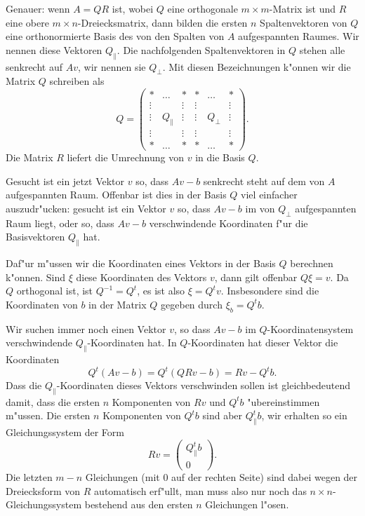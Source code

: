 Genauer: wenn $A=QR$ ist, wobei $Q$ eine orthogonale $m\times m$-Matrix
ist und $R$ eine obere $m\times n$-Dreiecksmatrix, dann bilden die
ersten $n$ Spaltenvektoren von $Q$ eine orthonormierte Basis des
von den Spalten von $A$ aufgespannten Raumes.
Wir nennen diese Vektoren
$Q_{\|}$.
Die nachfolgenden Spaltenvektoren
in $Q$ stehen alle senkrecht auf $Av$, wir nennen sie $Q_{\perp}$.
Mit diesen Bezeichnungen k"onnen wir die Matrix $Q$ schreiben als
\[
Q=\begin{pmatrix}
*     &\dots &     *&      *&\dots   &*     \\
\vdots&      &\vdots&\vdots &        &\vdots\\
\vdots&Q_{\|}&\vdots&\vdots&Q_{\perp}&\vdots\\
\vdots&      &\vdots&\vdots &        &\vdots\\
*     &\dots &     *&      *&\dots   &*     
\end{pmatrix}.
\]
Die Matrix $R$ liefert die Umrechnung von $v$ in die Basis $Q$.

Gesucht ist ein jetzt Vektor $v$ so, dass
$Av-b$ senkrecht steht auf dem von $A$ aufgespannten Raum.
Offenbar ist dies in der Basis $Q$ viel einfacher auszudr"ucken:
gesucht ist ein Vektor $v$ so, dass $Av-b$ im von $Q_{\perp}$
aufgespannten Raum liegt, oder so, dass $Av-b$ verschwindende Koordinaten
f"ur die Basisvektoren $Q_{\|}$ hat.

Daf"ur m"ussen wir die Koordinaten eines Vektors in der Basis $Q$
berechnen k"onnen.
Sind $\xi$ diese Koordinaten des Vektors $v$,
dann gilt offenbar $Q\xi = v$.
Da $Q$ orthogonal ist, ist $Q^{-1}=Q^t$, es ist also $\xi=Q^tv$.
Insbesondere sind die Koordinaten von $b$ in der
Matrix $Q$ gegeben durch $\xi_b=Q^tb$.

Wir suchen immer noch einen Vektor $v$, so dass $Av-b$ im $Q$-Koordinatensystem
verschwindende $Q_{\|}$-Koordinaten hat.
In $Q$-Koordinaten hat dieser
Vektor die Koordinaten
\[
Q^t(Av-b)=Q^t(QRv-b)=Rv-Q^tb.
\]
Dass die $Q_{\|}$-Koordinaten dieses Vektors verschwinden sollen ist
gleichbedeutend damit, dass die ersten $n$ Komponenten von 
$Rv$ und $Q^tb$ "ubereinstimmen m"ussen.
Die ersten $n$ Komponenten
von $Q^tb$ sind aber $Q_{\|}^tb$, wir erhalten so ein Gleichungssystem
der Form
\begin{equation}
Rv=\begin{pmatrix}
Q_{\|}^tb\\
0
\end{pmatrix}.
\label{qr-leastsquares}
\end{equation}
Die letzten $m-n$ Gleichungen (mit $0$ auf der rechten Seite) sind dabei
wegen der Dreiecksform von $R$ automatisch erf"ullt, man muss also nur
noch das $n\times n$-Gleichungssystem bestehend aus den ersten $n$
Gleichungen l"osen.

